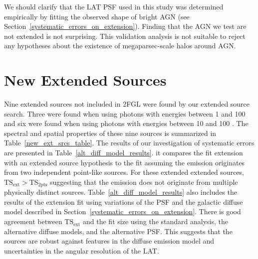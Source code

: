 \documentclass[12pt,preprint]{aastex}
\newcommand{\gev}{\text{GeV}\xspace}
\newcommand{\tsext}{{\ensuremath{\text{TS}_{\text{ext}}}}\xspace}
\newcommand{\tsinc}{\ensuremath{\text{TS}_{\text{2pts}}}\xspace}
\begin{document}
We should clarify that the LAT PSF used in this study was determined
empirically by fitting the observed shape of bright AGN (see
Section~\ref{systematic_errors_on_extension}). Finding that the AGN we
test are not extended is not surprising.  This validation analysis is
not suitable to reject any hypotheses about the existence of megaparsec-scale
halos around AGN.

\section{New Extended Sources}
\label{new_ext_srcs_section}



Nine extended sources not included in 2FGL were found by our 
extended source search.
Three were found when using photons with energies between 1 \gev
and 100 \gev and six were found when using photons with energies
between 10 \gev and 100 \gev.  The spectral and spatial properties of
these nine sources is summarized in Table~\ref{new_ext_srcs_table}.
The results of our investigation of systematic errors 
are presented in Table~\ref{alt_diff_model_results}.  it 
compares the fit extension with an extended source hypothesis
to the fit assuming the emission originates from two independent
point-like sources. For these extended extended sources,
$\tsext>\tsinc$ suggesting that the \gev emission does not originate
from multiple physically distinct sources.
Table~\ref{alt_diff_model_results}
also includes the results of the extension fit
using variations of the PSF and the galactic diffuse model described
in Section~\ref{systematic_errors_on_extension}.  There is good
agreement between \tsext and the fit size using the standard analysis,
the alternative diffuse models, and the alternative PSF.  This suggests
that the sources are robust against features in the diffuse emission
model and uncertainties in the angular resolution of the LAT.
\end{document}
